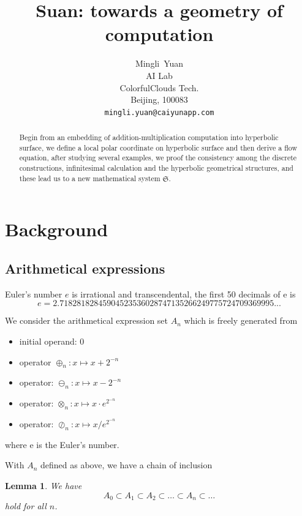 \documentclass{article}
\title{Suan: towards a geometry of computation}
\author{
  Mingli~Yuan \\
  AI Lab \\
  ColorfulClouds Tech.\\
  Beijing, 100083 \\
  \texttt{mingli.yuan@caiyunapp.com} \\
}
\newtheorem{lemma}{Lemma}
\begin{document}
\maketitle

\begin{abstract}
    Begin from an embedding of addition-multiplication computation into hyperbolic surface, we define a local polar
    coordinate on hyperbolic surface and then derive a flow equation, after studying several examples, we proof the
    consistency among the discrete constructions, infinitesimal calculation and the hyperbolic geometrical structures, and
    these lead us to a new mathematical system $\mathfrak{S}$.
\end{abstract}


\setcounter{tocdepth}{2}
\tableofcontents

\section{Background}\label{sec:background}

\subsection{Arithmetical expressions}\label{sec:expressions}

Euler's number $e$ is irrational and transcendental, the first 50 decimals of e is
$$
e = 2.71828182845904523536028747135266249775724709369995...
$$

We consider the arithmetical expression set $A_n$ which is freely generated from
\begin{itemize}
    \item initial operand: $0$
    \item operator $\oplus_n: x \mapsto x + 2^{-n}$
    \item operator: $\ominus_n: x \mapsto x - 2^{-n}$
    \item operator: $\otimes_n: x \mapsto x \cdot e^{2^{-n}}$
    \item operator: $\oslash_n: x \mapsto x / e^{2^{-n}}$
\end{itemize}
where e is the Euler's number.

With $A_n$ defined as above, we have a chain of inclusion
\begin{lemma}
\label{lemma:chainofinclusion}
We have
$$ A_0 \subset A_1 \subset A_2 \subset \ldots \subset A_n \subset \ldots $$
hold for all $n$.
\end{lemma}
\end{document}
